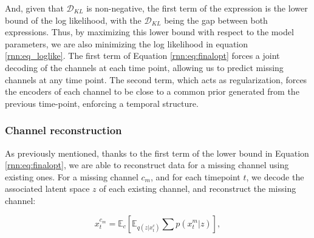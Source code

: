 And, given that $\mathcal{D}_{KL}$ is non-negative, the first term of the expression is the lower bound of the log likelihood, with the $\mathcal{D}_{KL}$ being the gap between both expressions. Thus, by maximizing this lower bound with respect to the model parameters, we are also minimizing the log likelihood in equation \ref{rnn:eq_loglike}. The first term of Equation \ref{rnn:eq:finalopt} forces a joint decoding of the channels at each time point, allowing us to predict missing channels at any time point. The second term, which acts as regularization, forces the encoders of each channel to be close to a common prior generated from the previous time-point, enforcing a temporal structure.

\subsubsection{Channel reconstruction}

As previously mentioned, thanks to the first term of the lower bound in Equation \ref{rnn:eq:finalopt}, we are able to reconstruct data for a missing channel using existing ones. For a missing channel $c_{m}$, and for each timepoint $t$, we decode the associated latent space $z$ of each existing channel, and reconstruct the missing channel:

\begin{equation}
    x^{c_m}_t = \mathbb{E}_{c} [ \mathbb{E}_{q(z|x^c_t)} \sum p(x^m_t|z) ],
\end{equation}



